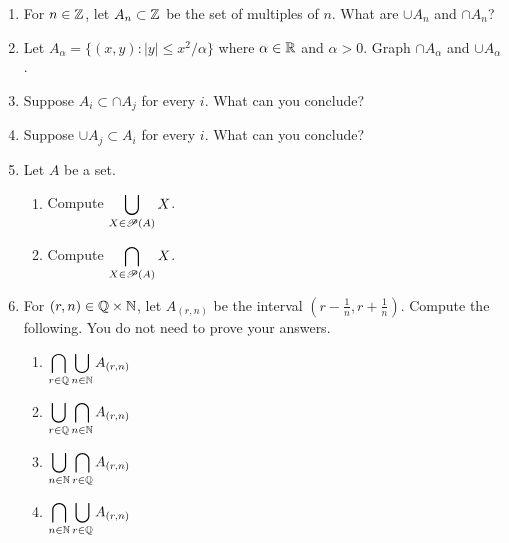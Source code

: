 \begin{enumerate}
    \item For $n \in \mathbb{Z}$, let $A_n \subset \mathbb{Z}$ be the set of multiples of $n$. What are $\cup A_n$ and $\cap A_n$?

    \item Let $A_\alpha = \{(x,y): |y| \leq x^2/\alpha\}$ where $\alpha \in \mathbb{R}$ and $\alpha > 0$. Graph $\cap A_\alpha$ and $\cup A_\alpha$.

    \item Suppose $A_i \subset \cap A_j$ for every $i$. What can you conclude?

    \item Suppose $\cup A_j \subset A_i$ for every $i$. What can you conclude?

    \item Let $A$ be a set. 
  \begin{enumerate}
      \item Compute $\displaystyle\bigcup_{X \in \mathscr{P}(A)} X$. 
      \item Compute $\displaystyle\bigcap_{X \in \mathscr{P}(A)} X$.
  \end{enumerate}


    \item For $(r, n) \in \mathbb{Q} \times \mathbb{N}$, let $A_{(r,n)}$ be the interval $(r - \frac{1}{n}, r + \frac{1}{n})$. Compute the following. You do not need to prove your answers.
  \begin{enumerate}
      \item $\displaystyle\bigcap_{r \in \mathbb{Q}} \bigcup_{n \in \mathbb{N}} A_{(r,n)}$
      \item $\displaystyle\bigcup_{r \in \mathbb{Q}} \bigcap_{n \in \mathbb{N}} A_{(r,n)}$
      \item $\displaystyle\bigcup_{n \in \mathbb{N}} \bigcap_{r \in \mathbb{Q}} A_{(r,n)}$
      \item $\displaystyle\bigcap_{n \in \mathbb{N}} \bigcup_{r \in \mathbb{Q}} A_{(r,n)}$
  \end{enumerate}

\end{enumerate}
